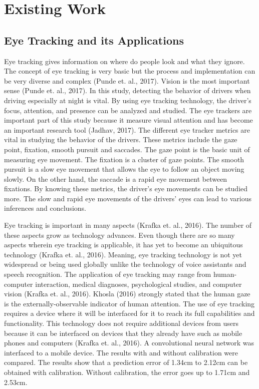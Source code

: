 \section{Existing Work}

\subsection{Eye Tracking and its Applications}
Eye tracking gives information on where do people look and what they ignore. The concept of eye tracking is very basic but the process and implementation can be very diverse and complex (Punde et. al., 2017). Vision is the most important sense (Punde et. al., 2017). In this study, detecting the behavior of drivers when driving especially at night is vital. By using eye tracking technology, the driver’s focus, attention, and presence can be analyzed and studied. The eye trackers are important part of this study because it measure visual attention and has become an important research tool (Jadhav, 2017). The different eye tracker metrics are vital in studying the behavior of the drivers. These metrics include the gaze point, fixation, smooth pursuit and saccades. The gaze point is the basic unit of measuring eye movement. The fixation is a cluster of gaze points. The smooth pursuit is a slow eye movement that allows the eye to follow an object moving slowly. On the other hand, the saccade is a rapid eye movement between fixations. By knowing these metrics, the driver’s eye movements can be studied more. The slow and rapid eye movements of the drivers’ eyes can lead to various inferences and conclusions.
\newline 

Eye tracking is important in many aspects (Krafka et. al., 2016). The number of these aspects grow as technology advances. Even though there are so many aspects wherein eye tracking is applicable, it has yet to become an ubiquitous technology (Krafka et. al., 2016). Meaning, eye tracking technology is not yet widespread or being used globally unlike the technology of voice assistants and speech recognition. The application of eye tracking may range from human-computer interaction, medical diagnoses, psychological studies, and computer vision (Krafka et. al., 2016). Khosla (2016) strongly stated that the human gaze is the externally-observable indicator of human attention. The use of eye tracking requires a device where it will be interfaced for it to reach its full capabilities and functionality. This technology does not require additional devices from users because it can be interfaced on devices that they already have such as mobile phones and computers (Krafka et. al., 2016). A convolutional neural network was interfaced to a mobile device. The results with and without calibration were compared. The results show that a prediction error of 1.34cm to 2.12cm can be obtained with calibration. Without calibration, the error goes up to 1.71cm and 2.53cm.
\newline 


